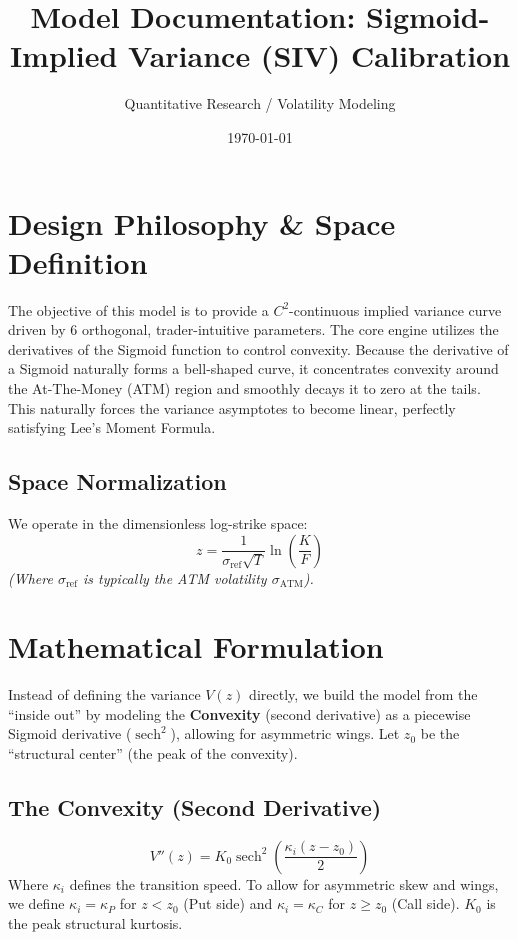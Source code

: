 \documentclass[11pt, a4paper]{article}
\title{\textbf{Model Documentation: Sigmoid-Implied Variance (SIV) Calibration}}
\author{Quantitative Research / Volatility Modeling}
\date{\today}
\DeclareMathOperator{\sech}{sech}
\begin{document}
\maketitle

\section{Design Philosophy \& Space Definition}
The objective of this model is to provide a $C^2$-continuous implied variance curve driven by 6 orthogonal, trader-intuitive parameters. The core engine utilizes the derivatives of the Sigmoid function to control convexity. Because the derivative of a Sigmoid naturally forms a bell-shaped curve, it concentrates convexity around the At-The-Money (ATM) region and smoothly decays it to zero at the tails. This naturally forces the variance asymptotes to become linear, perfectly satisfying Lee's Moment Formula.

\subsection*{Space Normalization}
We operate in the dimensionless log-strike space:
\begin{equation}
z = \frac{1}{\sigma_{\text{ref}} \sqrt{T}} \ln\left(\frac{K}{F}\right)
\end{equation}
\textit{(Where $\sigma_{\text{ref}}$ is typically the ATM volatility $\sigma_{\text{ATM}}$).}

\section{Mathematical Formulation}
Instead of defining the variance $V(z)$ directly, we build the model from the ``inside out'' by modeling the \textbf{Convexity} (second derivative) as a piecewise Sigmoid derivative ($\sech^2$), allowing for asymmetric wings. Let $z_0$ be the ``structural center'' (the peak of the convexity).

\subsection{The Convexity (Second Derivative)}
\begin{equation}
V''(z) = K_0 \sech^2\left(\frac{\kappa_i (z - z_0)}{2}\right)
\end{equation}
Where $\kappa_i$ defines the transition speed. To allow for asymmetric skew and wings, we define $\kappa_i = \kappa_P$ for $z < z_0$ (Put side) and $\kappa_i = \kappa_C$ for $z \ge z_0$ (Call side). $K_0$ is the peak structural kurtosis.
\end{document}
